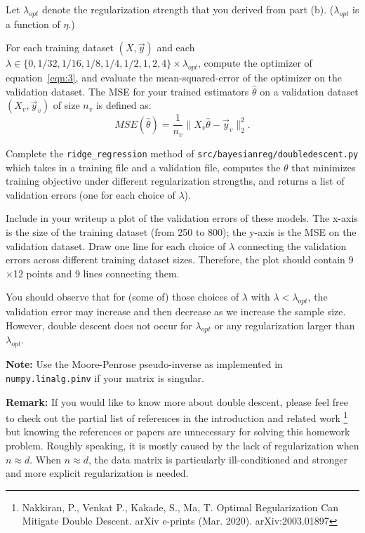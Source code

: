 Let $\lambda_{opt}$ denote the regularization strength that you derived from part (b). ($\lambda_{opt}$  is a function of $\eta$.)

For each training dataset $(X, \vec{y})$ and each $\lambda \in \{0, 1/32, 1/16, 1/8, 1/4 , 1/2, 1, 2, 4\} \times \lambda_{opt}$, compute the optimizer of equation~\eqref{eqn:3}, and evaluate the mean-squared-error of the optimizer on the validation dataset. The MSE for your trained estimators $\hat{\theta}$ on a validation dataset $(X_v, \vec{y}_v)$ of size $n_v$ is defined as: $$MSE(\hat{\theta}) = \frac{1}{n_v} \|X_v \hat{\theta}-\vec{y}_v\|^2_2.$$

Complete the \texttt{ridge\_regression} method of \texttt{src/bayesianreg/doubledescent.py} which takes in a training file and a validation file, computes the $\theta$ that minimizes training objective under different regularization strengths, and returns a list of validation errors (one for each choice of $\lambda$).

Include in your writeup a plot of the validation errors of these models. The x-axis is the size of the training dataset (from 250 to 800); the y-axis is the MSE on the validation dataset. Draw one line for each choice of $\lambda$ connecting the validation errors across different training dataset sizes. Therefore, the plot should contain 9$\times$12 points and 9 lines connecting them. 

You should observe that for (some of) those choices of $\lambda$ with $\lambda<\lambda_{opt}$, the validation error may increase and then decrease as we increase the sample size. 
However, double descent does not occur for $\lambda_{opt}$ or any regularization larger than $\lambda_{opt}$. 

\textbf{Note:} Use the Moore-Penrose pseudo-inverse as implemented in \texttt{numpy.linalg.pinv} if your matrix is singular.

\textbf{Remark: } If you would like to know more about double descent, please feel free to check out the partial list of references in the introduction and related work \footnote{Nakkiran, P., Venkat P., Kakade, S., Ma, T. Optimal Regularization Can Mitigate Double Descent. arXiv e-prints (Mar. 2020). arXiv:2003.01897} but knowing the references or papers are unnecessary for solving this homework problem. Roughly speaking, it is mostly caused by the lack of regularization when $n \approx d$. When $n\approx d$, the data matrix is particularly ill-conditioned and stronger and more explicit regularization is needed.
